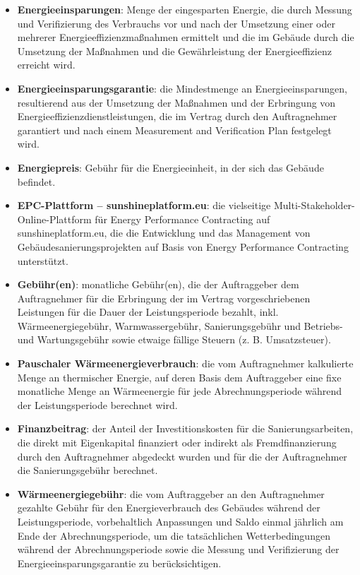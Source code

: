\begin{multicols}{2}
\begin{itemize}[label={}]
  \item\textbf{Energieeinsparungen}: Menge der eingesparten Energie, die durch Messung und Verifizierung des Verbrauchs vor und nach der Umsetzung einer oder mehrerer Energieeffizienzmaßnahmen ermittelt und die im Gebäude durch die Umsetzung der Maßnahmen und die Gewährleistung der Energieeffizienz erreicht wird.
  \item\textbf{Energieeinsparungsgarantie}: die Mindestmenge an Energieeinsparungen, resultierend aus der Umsetzung der Maßnahmen und der Erbringung von Energieeffizienzdienstleistungen, die im Vertrag durch den Auftragnehmer garantiert und nach einem Measurement and Verification Plan festgelegt wird.
  \item\textbf{Energiepreis}: Gebühr für die Energieeinheit, in der sich das Gebäude befindet.
  \item\textbf{EPC-Plattform – sunshineplatform.eu}: die vielseitige Multi-Stakeholder-Online-Plattform für Energy Performance Contracting auf sunshineplatform.eu, die die Entwicklung und das Management von Gebäudesanierungsprojekten auf Basis von Energy Performance Contracting unterstützt.
  \item\textbf{Gebühr(en)}: monatliche Gebühr(en), die der Auftraggeber dem Auftragnehmer für die Erbringung der im Vertrag vorgeschriebenen Leistungen für die Dauer der Leistungsperiode bezahlt, inkl. Wärmeenergiegebühr, Warmwassergebühr, Sanierungsgebühr und Betriebs- und Wartungsgebühr sowie etwaige fällige Steuern (z. B. Umsatzsteuer).
  \item\textbf{Pauschaler Wärmeenergieverbrauch}: die vom Auftragnehmer kalkulierte Menge an thermischer Energie, auf deren Basis dem Auftraggeber eine fixe monatliche Menge an Wärmeenergie für jede Abrechnungsperiode während der Leistungsperiode berechnet wird.
  \item\textbf{Finanzbeitrag}: der Anteil der Investitionskosten für die Sanierungsarbeiten, die direkt mit Eigenkapital finanziert oder indirekt als Fremdfinanzierung durch den Auftragnehmer abgedeckt wurden und für die der Auftragnehmer die Sanierungsgebühr berechnet.
  \item\textbf{Wärmeenergiegebühr}: die vom Auftraggeber an den Auftragnehmer gezahlte Gebühr für den Energieverbrauch des Gebäudes während der Leistungsperiode, vorbehaltlich Anpassungen und Saldo einmal jährlich am Ende der Abrechnungsperiode, um die tatsächlichen Wetterbedingungen während der Abrechnungsperiode sowie die Messung und Verifizierung der Energieeinsparungsgarantie zu berücksichtigen.

\end{itemize}
\end{multicols}
